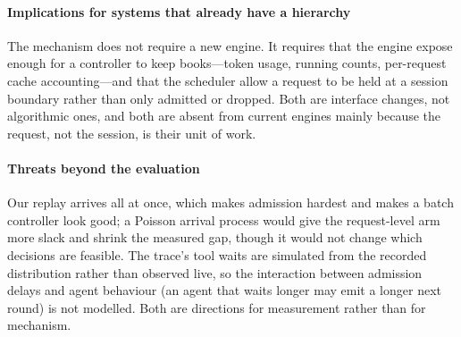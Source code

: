 \paragraph{Implications for systems that already have a hierarchy} The mechanism does not
require a new engine. It requires that the engine expose enough for a controller to keep
books---token usage, running counts, per-request cache accounting---and that the scheduler
allow a request to be held at a session boundary rather than only admitted or dropped.
Both are interface changes, not algorithmic ones, and both are absent from current engines
mainly because the request, not the session, is their unit of work.

\paragraph{Threats beyond the evaluation} Our replay arrives all at once, which makes
admission hardest and makes a batch controller look good; a Poisson arrival process would
give the request-level arm more slack and shrink the measured gap, though it would not
change which decisions are feasible. The trace's tool waits are simulated from the
recorded distribution rather than observed live, so the interaction between admission
delays and agent behaviour (an agent that waits longer may emit a longer next round) is
not modelled. Both are directions for measurement rather than for mechanism.
